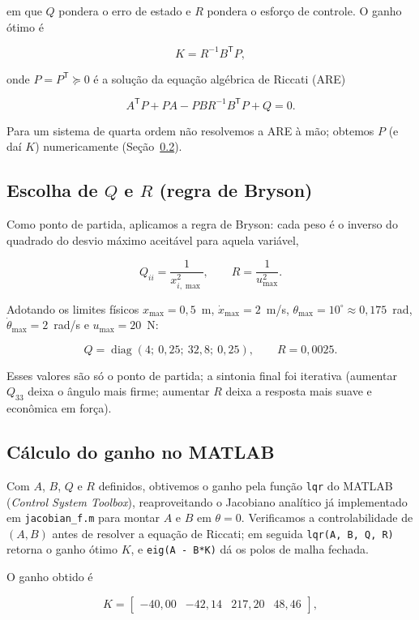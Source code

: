 \documentclass[brazil, 12pt]{article}
\begin{document}
em que $Q$ pondera o erro de estado e $R$ pondera o esforço de controle. O ganho
ótimo é

\[
K = R^{-1} B^{\mathsf T} P,
\]

onde $P = P^{\mathsf T} \succeq 0$ é a solução da equação algébrica de Riccati (ARE)

\[
A^{\mathsf T} P + P A - P B R^{-1} B^{\mathsf T} P + Q = 0.
\]

Para um sistema de quarta ordem não resolvemos a ARE à mão; obtemos $P$ (e daí
$K$) numericamente (Seção~\ref{sec:matlab}).

\subsection{Escolha de $Q$ e $R$ (regra de Bryson)}

Como ponto de partida, aplicamos a regra de Bryson: cada peso é o inverso do
quadrado do desvio máximo aceitável para aquela variável,

\[
Q_{ii} = \frac{1}{x_{i,\max}^{2}}, \qquad R = \frac{1}{u_{\max}^{2}}.
\]

Adotando os limites físicos $x_{\max}=0{,}5$~m, $\dot{x}_{\max}=2$~m/s,
$\theta_{\max}=10^{\circ}\approx0{,}175$~rad, $\dot{\theta}_{\max}=2$~rad/s e
$u_{\max}=20$~N:

\[
Q = \operatorname{diag}(4;\ 0{,}25;\ 32{,}8;\ 0{,}25),
\qquad R = 0{,}0025.
\]

Esses valores são só o ponto de partida; a sintonia final foi iterativa
(aumentar $Q_{33}$ deixa o ângulo mais firme; aumentar $R$ deixa a resposta mais
suave e econômica em força).

\subsection{Cálculo do ganho no MATLAB}
\label{sec:matlab}

Com $A$, $B$, $Q$ e $R$ definidos, obtivemos o ganho pela função \texttt{lqr}
do MATLAB (\emph{Control System Toolbox}), reaproveitando o Jacobiano analítico
já implementado em \texttt{jacobian\_f.m} para montar $A$ e $B$ em $\theta=0$.
Verificamos a controlabilidade de $(A,B)$ antes de resolver a equação de
Riccati; em seguida \texttt{lqr(A, B, Q, R)} retorna o ganho ótimo $K$, e
\texttt{eig(A - B*K)} dá os polos de malha fechada.

O ganho obtido é

\[
K = \begin{bmatrix} -40{,}00 & -42{,}14 & 217{,}20 & 48{,}46 \end{bmatrix},
\]
\end{document}
